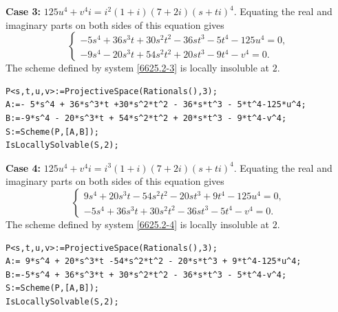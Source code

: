 \documentclass[a4paper,12pt,english,reqno]{amsart}
\begin{document}
{\bf Case 3:} $125u^4+v^4i=i^2(1+i)(7+2i)(s+ti)^4$.  Equating the real and imaginary parts on both sides of this equation gives
\begin{equation}\label{6625.2-3}
\begin{cases}
-5s^4 + 36s^3t + 30s^2t^2 - 36st^3 - 5t^4 - 125u^4=0,\\
-9s^4 - 20s^3t + 54s^2t^2 + 20st^3 - 9t^4 - v^4=0.
\end{cases}
\end{equation}
The scheme defined by system \eqref{6625.2-3} is locally insoluble at $2$.

\begin{lstlisting}
P<s,t,u,v>:=ProjectiveSpace(Rationals(),3);
A:=- 5*s^4 + 36*s^3*t +30*s^2*t^2 - 36*s*t^3 - 5*t^4-125*u^4;
B:=-9*s^4 - 20*s^3*t + 54*s^2*t^2 + 20*s*t^3 - 9*t^4-v^4;
S:=Scheme(P,[A,B]);
IsLocallySolvable(S,2);
\end{lstlisting}


{\bf Case 4:} $125u^4+v^4i=i^3(1+i)(7+2i)(s+ti)^4$.  Equating the real and imaginary parts on both sides of this equation gives
\begin{equation}\label{6625.2-4}
\begin{cases}
9s^4 + 20s^3t - 54s^2t^2 - 20st^3 + 9t^4 - 125u^4=0,\\
-5s^4 + 36s^3t + 30s^2t^2 - 36st^3 - 5t^4 - v^4=0.
\end{cases}
\end{equation}
The scheme defined by system \eqref{6625.2-4} is locally insoluble at $2$.

\begin{lstlisting}
P<s,t,u,v>:=ProjectiveSpace(Rationals(),3);
A:= 9*s^4 + 20*s^3*t -54*s^2*t^2 - 20*s*t^3 + 9*t^4-125*u^4;
B:=-5*s^4 + 36*s^3*t + 30*s^2*t^2 - 36*s*t^3 - 5*t^4-v^4;
S:=Scheme(P,[A,B]);
IsLocallySolvable(S,2);
\end{lstlisting}
\end{document}
